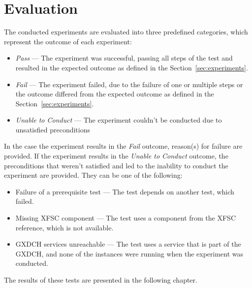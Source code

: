 \section{Evaluation}\label{sec:evaluation}

The conducted experiments are evaluated into three predefined categories, which represent the outcome of each experiment:

\begin{itemize}
    \item \textit{Pass} --- The experiment was successful, passing all steps of the test and resulted in the expected outcome as defined in the Section~\ref{sec:experiments}.
    \item \textit{Fail} --- The experiment failed, due to the failure of one or multiple steps or the outcome differed from the expected outcome as defined in the Section~\ref{sec:experiments}.
    \item \textit{Unable to Conduct} --- The experiment couldn't be conducted due to unsatisfied preconditions
\end{itemize}

In the case the experiment results in the \textit{Fail} outcome, reason(s) for failure are provided.
If the experiment results in the \textit{Unable to Conduct} outcome, the preconditions that weren't satisfied and led to the inability to conduct the experiment are provided.
They can be one of the following:
\begin{itemize}
    \item Failure of a prerequisite test --- The test depends on another test, which failed.
    \item Missing XFSC component --- The test uses a component from the XFSC reference, which is not available.
    \item GXDCH services unreachable --- The test uses a service that is part of the GXDCH, and none of the instances were running when the experiment was conducted.
\end{itemize}

The results of these tests are presented in the following chapter.
